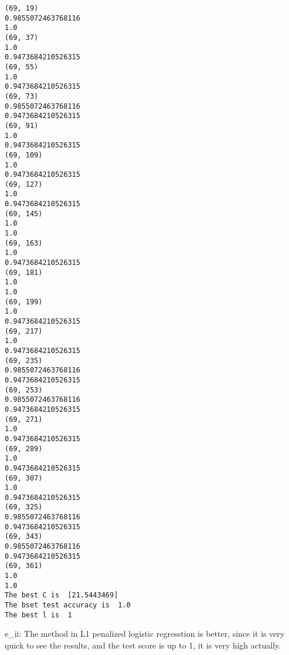 \documentclass[11pt]{article}
\begin{document}
    \begin{Verbatim}[commandchars=\\\{\}]
(69, 19)
0.9855072463768116
1.0
(69, 37)
1.0
0.9473684210526315
(69, 55)
1.0
0.9473684210526315
(69, 73)
0.9855072463768116
0.9473684210526315
(69, 91)
1.0
0.9473684210526315
(69, 109)
1.0
0.9473684210526315
(69, 127)
1.0
0.9473684210526315
(69, 145)
1.0
1.0
(69, 163)
1.0
0.9473684210526315
(69, 181)
1.0
1.0
(69, 199)
1.0
0.9473684210526315
(69, 217)
1.0
0.9473684210526315
(69, 235)
0.9855072463768116
0.9473684210526315
(69, 253)
0.9855072463768116
0.9473684210526315
(69, 271)
1.0
0.9473684210526315
(69, 289)
1.0
0.9473684210526315
(69, 307)
1.0
0.9473684210526315
(69, 325)
0.9855072463768116
0.9473684210526315
(69, 343)
0.9855072463768116
0.9473684210526315
(69, 361)
1.0
1.0
The best C is  [21.5443469]
The bset test accuracy is  1.0
The best l is  1

    \end{Verbatim}

    e\_ii: The method in L1 penalized logistic regresstion is better, since
it is very quick to see the results, and the test score is up to 1, it
is very high actually.
\end{document}

